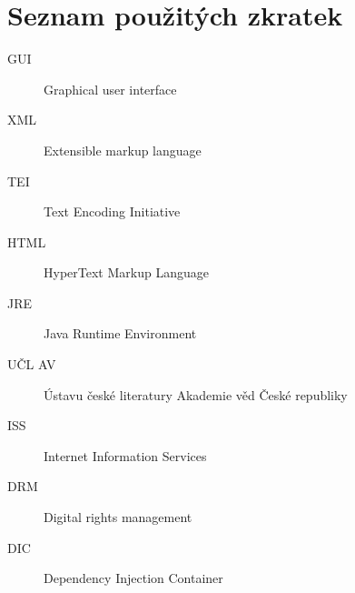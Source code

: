\documentclass[thesis=B,czech]{FITthesis}[2012/06/26]
\begin{document}
\chapter{Seznam použitých zkratek}
\begin{description}
	\item[GUI] Graphical user interface
	\item[XML] Extensible markup language
	\item[TEI] Text Encoding Initiative
	\item[HTML] HyperText Markup Language
	\item[JRE] Java Runtime Environment
	\item[UČL AV] Ústavu české literatury Akademie věd České republiky
	\item[ISS] Internet Information Services
	\item[DRM] Digital rights management
	\item[DIC] Dependency Injection Container
\end{description}
\end{document}

